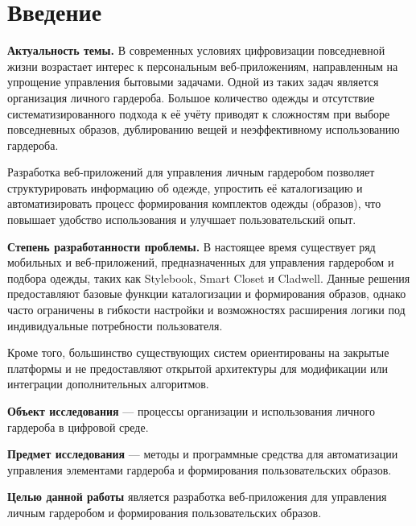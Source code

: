 \section*{Введение}

\textbf{Актуальность темы.}  
В современных условиях цифровизации повседневной жизни возрастает интерес к персональным веб-приложениям, направленным на упрощение управления бытовыми задачами. Одной из таких задач является организация личного гардероба. Большое количество одежды и отсутствие систематизированного подхода к её учёту приводят к сложностям при выборе повседневных образов, дублированию вещей и неэффективному использованию гардероба.

Разработка веб-приложений для управления личным гардеробом позволяет структурировать информацию об одежде, упростить её каталогизацию и автоматизировать процесс формирования комплектов одежды (образов), что повышает удобство использования и улучшает пользовательский опыт.

\textbf{Степень разработанности проблемы.}  
В настоящее время существует ряд мобильных и веб-приложений, предназначенных для управления гардеробом и подбора одежды, таких как Stylebook, Smart Closet и Cladwell. Данные решения предоставляют базовые функции каталогизации и формирования образов, однако часто ограничены в гибкости настройки и возможностях расширения логики под индивидуальные потребности пользователя.

Кроме того, большинство существующих систем ориентированы на закрытые платформы и не предоставляют открытой архитектуры для модификации или интеграции дополнительных алгоритмов.

\textbf{Объект исследования} — процессы организации и использования личного гардероба в цифровой среде.

\textbf{Предмет исследования} — методы и программные средства для автоматизации управления элементами гардероба и формирования пользовательских образов.

\textbf{Целью данной работы} является разработка веб-приложения для управления личным гардеробом и формирования пользовательских образов.
